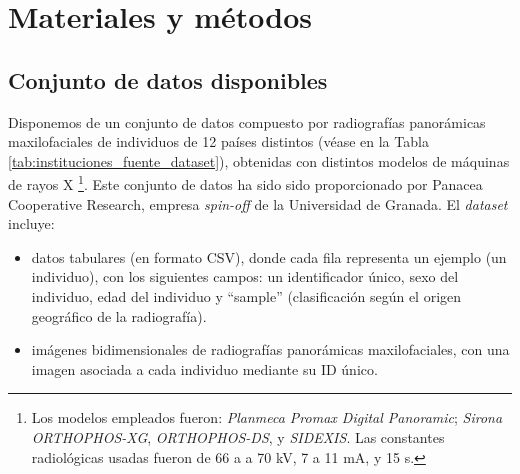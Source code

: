 \chapter{Materiales y métodos} 


\section{Conjunto de datos disponibles}

Disponemos de un conjunto de datos compuesto por radiografías panorámicas maxilofaciales de individuos de 12 países distintos (véase en la Tabla \ref{tab:instituciones_fuente_dataset}), obtenidas con distintos modelos de máquinas de rayos X%
\footnote{
    Los modelos empleados fueron: \textit{Planmeca Promax Digital Panoramic}; \textit{Sirona ORTHOPHOS-XG}, \textit{ORTHOPHOS-DS}, y \textit{SIDEXIS}. Las constantes radiológicas usadas fueron de 66 a a 70 kV, 7 a 11 mA, y 15 s.
}.
Este conjunto de datos ha sido sido proporcionado por Panacea Cooperative Research, empresa \textit{spin-off} de la Universidad de Granada. El \textit{dataset} incluye:

\begin{itemize}

    \item datos tabulares (en formato CSV), donde cada fila representa un ejemplo (un individuo), con los siguientes campos: un identificador único, sexo del individuo, edad del individuo y ``sample'' (clasificación según el origen geográfico de la radiografía).

    \item imágenes bidimensionales de radiografías panorámicas maxilofaciales, con una imagen asociada a cada individuo mediante su ID único. 

\end{itemize}

